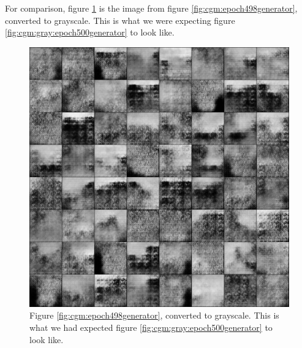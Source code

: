 \documentclass[11pt,letterpaper]{article}
\begin{document}
				For comparison, figure \ref{fig:cgm:epoch498grayscale} is the image from figure \ref{fig:cgm:epoch498generator}, converted to grayscale.
				This is what we were expecting figure \ref{fig:cgm:gray:epoch500generator} to look like.
				\begin{figure}
					\centering
					\includegraphics[width=1.0\linewidth]{results/model3/epoch498grayscale}
					\caption{Figure \ref{fig:cgm:epoch498generator}, converted to grayscale. This is what we had expected figure \ref{fig:cgm:gray:epoch500generator} to look like.}
					\label{fig:cgm:epoch498grayscale}
				\end{figure}
\end{document}
